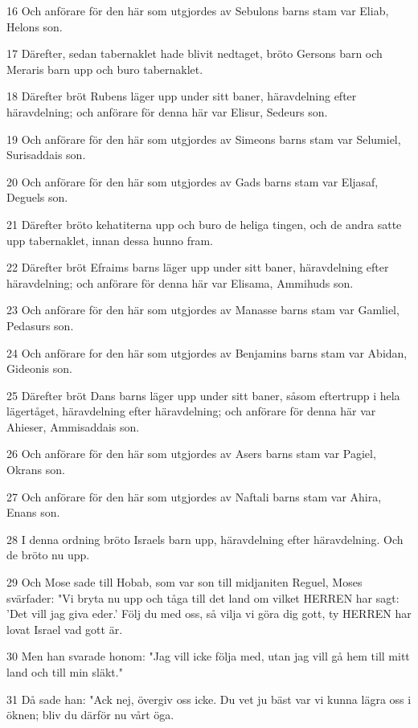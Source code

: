 \par 16 Och anförare för den här som utgjordes av Sebulons barns stam var Eliab, Helons son.
\par 17 Därefter, sedan tabernaklet hade blivit nedtaget, bröto Gersons barn och Meraris barn upp och buro tabernaklet.
\par 18 Därefter bröt Rubens läger upp under sitt baner, häravdelning efter häravdelning; och anförare för denna här var Elisur, Sedeurs son.
\par 19 Och anförare för den här som utgjordes av Simeons barns stam var Selumiel, Surisaddais son.
\par 20 Och anförare för den här som utgjordes av Gads barns stam var Eljasaf, Deguels son.
\par 21 Därefter bröto kehatiterna upp och buro de heliga tingen, och de andra satte upp tabernaklet, innan dessa hunno fram.
\par 22 Därefter bröt Efraims barns läger upp under sitt baner, häravdelning efter häravdelning; och anförare för denna här var Elisama, Ammihuds son.
\par 23 Och anförare för den här som utgjordes av Manasse barns stam var Gamliel, Pedasurs son.
\par 24 Och anförare for den här som utgjordes av Benjamins barns stam var Abidan, Gideonis son.
\par 25 Därefter bröt Dans barns läger upp under sitt baner, såsom eftertrupp i hela lägertåget, häravdelning efter häravdelning; och anförare för denna här var Ahieser, Ammisaddais son.
\par 26 Och anförare för den här som utgjordes av Asers barns stam var Pagiel, Okrans son.
\par 27 Och anförare för den här som utgjordes av Naftali barns stam var Ahira, Enans son.
\par 28 I denna ordning bröto Israels barn upp, häravdelning efter häravdelning. Och de bröto nu upp.
\par 29 Och Mose sade till Hobab, som var son till midjaniten Reguel, Moses svärfader: "Vi bryta nu upp och tåga till det land om vilket HERREN har sagt: 'Det vill jag giva eder.' Följ du med oss, så vilja vi göra dig gott, ty HERREN har lovat Israel vad gott är.
\par 30 Men han svarade honom: "Jag vill icke följa med, utan jag vill gå hem till mitt land och till min släkt."
\par 31 Då sade han: "Ack nej, övergiv oss icke. Du vet ju bäst var vi kunna lägra oss i öknen; bliv du därför nu vårt öga.
